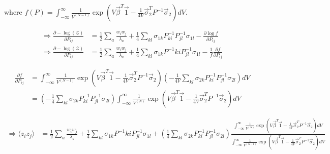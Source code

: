 \documentclass{article}
\newcommand{\z}{\mathscr{Z}}
\begin{document}
where $f(P)=\int_{-\infty}^\infty\frac{1}{V^{(N-1)}}\exp\left(V\vec{\beta}^T\vec{1}-\frac{1}{4V}\vec{\sigma}_2^TP^{-1}\vec{\sigma}_2\right)dV $.

\begin{align*}
\Rightarrow\frac{\partial -\log(\z)}{\partial P_{ij}}&=\frac{1}{2}\sum_a\frac{w_iw_j}{\lambda_a}+\frac{1}{4}\sum_{kl}\sigma_{1k}P^{-1}_{ki}P^{-1}_{jl}\sigma_{1l}-\frac{\partial \log f}{\partial P_{ij}}
\\\Rightarrow\frac{\partial -\log(\z)}{\partial P_{ij}}&=\frac{1}{2}\sum_a\frac{w_iw_j}{\lambda_a}+\frac{1}{4}\sum_{kl}\sigma_{1k}P^{-1}{ki}P^{-1}_{jl}\sigma_{1l}-\frac{1}{f}\frac{\partial f}{\partial P_{ij}}
\end{align*}

\begin{align*}
\frac{\partial f}{\partial P_{ij}}&=\int_{-\infty}^\infty\frac{1}{V^{(N-1)}}\exp\left(V\vec{\beta}^T\vec{1}-\frac{1}{4V}\vec{\sigma}_2^TP^{-1}\vec{\sigma}_2\right)\left(-\frac{1}{4V}\sum_{kl}\sigma_{2k}P^{-1}_{ki}P^{-1}_{jl}\sigma_{2l}\right)dV
\\&=\left(-\frac{1}{4}\sum_{kl}\sigma_{2k}P^{-1}_{ki}P^{-1}_{jl}\sigma_{2l}\right)\int_{-\infty}^\infty\frac{1}{V^{(N)}}\exp\left(V\vec{\beta}^T\vec{1}-\frac{1}{4V}\vec{\sigma}_2^TP^{-1}\vec{\sigma}_2\right)dV
\end{align*}

\begin{align*}
\Rightarrow \langle z_iz_j\rangle &=\frac{1}{2}\sum_a\frac{w_iw_j}{\lambda_a}+\frac{1}{4}\sum_{kl}\sigma_{1k}P^{-1}{ki}P^{-1}_{jl}\sigma_{1l}+\left(\frac{1}{4}\sum_{kl}\sigma_{2k}P^{-1}_{ki}P^{-1}_{jl}\sigma_{2l}\right)\frac{\int_{-\infty}^\infty\frac{1}{V^{(N)}}\exp\left(V\vec{\beta}^T\vec{1}-\frac{1}{4V}\vec{\sigma}_2^TP^{-1}\vec{\sigma}_2\right)dV}{\int_{-\infty}^\infty\frac{1}{V^{(N-1)}}\exp\left(V\vec{\beta}^T\vec{1}-\frac{1}{4V}\vec{\sigma}_2^TP^{-1}\vec{\sigma}_2\right)dV}
\end{align*}

\nocite{*}


\end{document}
